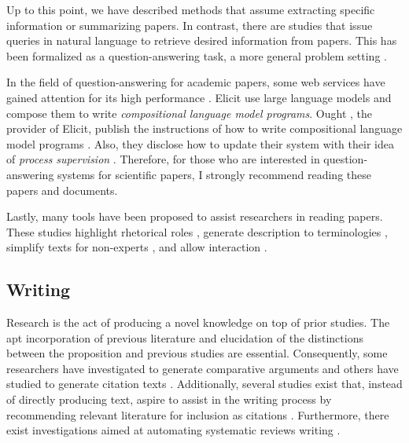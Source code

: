 \documentclass{book}
\begin{document}
Up to this point, we have described methods that assume extracting specific information or summarizing papers. In contrast, there are studies that issue queries in natural language to retrieve desired information from papers. This has been formalized as a question-answering task, a more general problem setting \cite{lu2022learn,ruggeri2022argscichat,saikh2022scienceqa}. 

In the field of question-answering for academic papers, some web services have gained attention for its high performance \cite{elicit,scispace}. Elicit use large language models and compose them to write \textit{compositional language model programs}. Ought \cite{ought}, the provider of Elicit, publish the instructions of how to write compositional language model programs \cite{primer2022}. Also, they disclose how to update their system with their idea of \textit{process supervision} \cite{reppert2023iterated}. Therefore, for those who are interested in question-answering systems for scientific papers, I strongly recommend reading these papers and documents.

Lastly, many tools have been proposed to assist researchers in reading papers. These studies highlight rhetorical roles \cite{fok2023scim,lauscher2018arguminsci}, generate description to terminologies \cite{august2022generating,head2021augmenting,murthy2022accord}, simplify texts for non-experts \cite{august2022paper,jeblick2022chatgpt}, and allow interaction \cite{kang2022threddy,elicit,scispace}.

\subsection{Writing}
Research is the act of producing a novel knowledge on top of prior studies. The apt incorporation of previous literature and elucidation of the distinctions between the proposition and previous studies are essential. Consequently, some researchers have investigated to generate comparative arguments \cite{yu2022scientific} and others have studied to generate citation texts \cite{arita2022citation,gu2022controllable,wang2021autocite,xing2020automatic,funkquist2022citebench}. Additionally, several studies exist that, instead of directly producing text, aspire to assist in the writing process by recommending relevant literature for inclusion as citations \cite{farber2020citation,zhang2020dual,duma2019contextual,farber2018cite,gosangi2021use}. Furthermore, there exist investigations aimed at automating systematic reviews writing \cite{dones2022systematic}.
\end{document}

